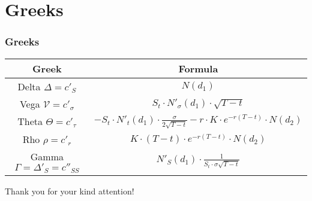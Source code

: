 \documentclass[ignorenonframetext, 9pt]{beamer}
\begin{document}
\section{Greeks}

\begin{frame}
\frametitle{Greeks}

{
\footnotesize
\begin{tabular}{c | c}
\textbf{Greek} & \textbf{Formula} \\ \hline
Delta $\Delta = c'_S$ & $N(d_1)$ \\ \hline

Vega $\mathcal{V} = c'_\sigma$ & $S_t \cdot N'_\sigma(d_1) \cdot\sqrt{T-t}$ \\ \hline

Theta $\Theta = c'_\tau$ & $-S_t \cdot N'_t(d_1)\cdot \frac{\sigma}{2\sqrt{T-t}} - r\cdot K\cdot e^{-r(T-t)}\cdot N(d_2)$ \\ \hline

Rho $\rho = c'_r$ & $K\cdot (T-t)\cdot e^{-r(T-t)}\cdot N(d_2)$ \\ \hline

Gamma $\Gamma = \Delta'_S = c''_{SS}$ & $N'_S(d_1) \cdot \frac{1}{S_t\cdot\sigma\sqrt{T-t}}$ \\
\end{tabular}
}

\end{frame}

\begin{frame}
\centering Thank you for your kind attention!
\end{frame}
\end{document}
